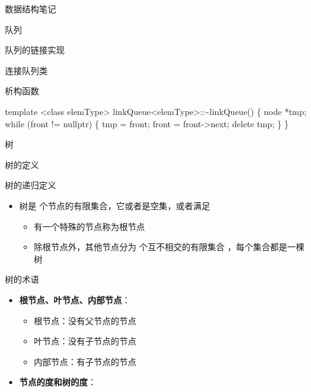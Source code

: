 \documentclass[
  ignorenonframetext,
]{beamer}
\newenvironment{Shaded}{}{}
\newcommand{\NormalTok}[1]{#1}
\providecommand{\tightlist}{%
  \setlength{\itemsep}{0pt}\setlength{\parskip}{0pt}}
\begin{document}
\begin{frame}[fragile]{数据结构笔记}
\begin{block}{队列}
\begin{block}{队列的链接实现}
\begin{block}{连接队列类}
\begin{block}{析构函数}
\protect{}\label{ux6790ux6784ux51fdux6570-4}
\begin{Shaded}
\begin{Highlighting}[]
\NormalTok{template \textless{}class elemType\textgreater{}}
\NormalTok{linkQueue\textless{}elemType\textgreater{}::\textasciitilde{}linkQueue()}
\NormalTok{\{}
\NormalTok{  node *tmp;}
\NormalTok{  while (front != nullptr)}
\NormalTok{  \{}
\NormalTok{    tmp = front;}
\NormalTok{    front = front{-}\textgreater{}next;}
\NormalTok{    delete tmp;}
\NormalTok{  \}}
\NormalTok{\}}
\end{Highlighting}
\end{Shaded}
\end{block}
\end{block}
\end{block}
\end{block}

\begin{block}{树}
\protect{}\label{ux6811}
\begin{block}{树的定义}
\protect{}\label{ux6811ux7684ux5b9aux4e49}
\begin{block}{树的递归定义}
\protect{}\label{ux6811ux7684ux9012ux5f52ux5b9aux4e49}
\begin{itemize}
\tightlist
\item
  树是 {} 个节点的有限集合，它或者是空集，或者满足

  \begin{itemize}
  \tightlist
  \item
    有一个特殊的节点称为根节点
  \item
    除根节点外，其他节点分为 {} 个互不相交的有限集合
    {}，每个集合都是一棵树
  \end{itemize}
\end{itemize}
\end{block}

\begin{block}{树的术语}
\protect{}\label{ux6811ux7684ux672fux8bed}
\begin{itemize}
\tightlist
\item
  \textbf{根节点、叶节点、内部节点}：

  \begin{itemize}
  \tightlist
  \item
    根节点：没有父节点的节点
  \item
    叶节点：没有子节点的节点
  \item
    内部节点：有子节点的节点
  \end{itemize}
\item
  \textbf{节点的度和树的度}：


\end{itemize}
\end{block}
\end{block}
\end{block}
\end{frame}
\end{document}
